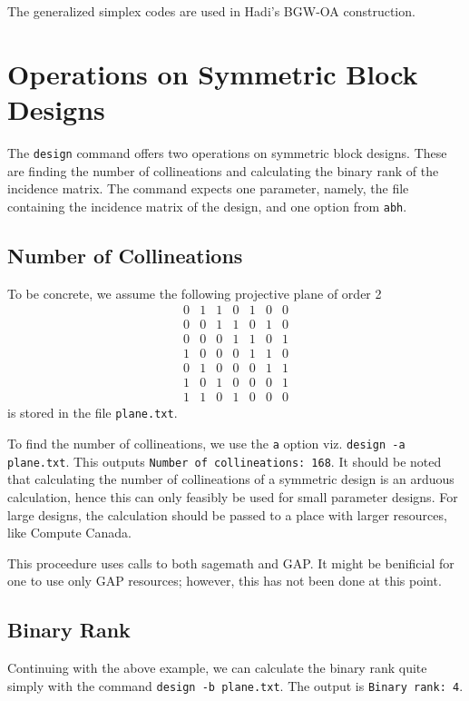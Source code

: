 \documentclass[a4paper,10pt]{article}
\begin{document}
The generalized simplex codes are used in Hadi's BGW-OA construction.

\section{\centering\sc Operations on Symmetric Block Designs}

The {\tt design} command offers two operations on symmetric block designs. These are finding the number of collineations and calculating the binary rank of the incidence matrix. The command expects one parameter, namely, the file containing the incidence matrix of the design, and one option from {\tt abh}.

\subsection{\sc Number of Collineations}
To be concrete, we assume the following projective plane of order 2
\[
 \begin{array}{rrrrrrr}
0 & 1 & 1 & 0 & 1 & 0 & 0 \\
0 & 0 & 1 & 1 & 0 & 1 & 0 \\
0 & 0 & 0 & 1 & 1 & 0 & 1 \\
1 & 0 & 0 & 0 & 1 & 1 & 0 \\
0 & 1 & 0 & 0 & 0 & 1 & 1 \\
1 & 0 & 1 & 0 & 0 & 0 & 1 \\
1 & 1 & 0 & 1 & 0 & 0 & 0
\end{array}
\]
is stored in the file {\tt plane.txt}.

To find the number of collineations, we use the {\tt a} option viz. {\tt design -a plane.txt}. This outputs {\tt Number of collineations: 168}. It should be noted that calculating the number of collineations of a symmetric design is an arduous calculation, hence this can only feasibly be used for small parameter designs. For large designs, the calculation should be passed to a place with larger resources, like Compute Canada.

This proceedure uses calls to both sagemath and GAP. It might be benificial for one to use only GAP resources; however, this has not been done at this point.

\subsection{\sc Binary Rank}
Continuing with the above example, we can calculate the binary rank quite simply with the command {\tt design -b plane.txt}. The output is {\tt Binary rank: 4}.
\end{document}
